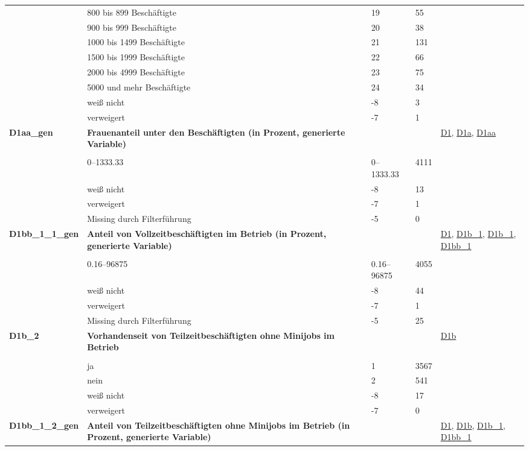\begin{longtable}{| L{2.5cm} | L{8.25cm}| C{1.5cm} | R{1.25cm} | C{2.25cm} |  }
   & 800 bis 899 Beschäftigte & 19 & 55 &  \\ 
   & 900 bis 999 Beschäftigte & 20 & 38 &  \\ 
   & 1000 bis 1499 Beschäftigte & 21 & 131 &  \\ 
   & 1500 bis 1999 Beschäftigte & 22 & 66 &  \\ 
   & 2000 bis 4999 Beschäftigte & 23 & 75 &  \\ 
   & 5000 und mehr Beschäftigte & 24 & 34 &  \\ 
   & weiß nicht & -8 & 3 &  \\ 
   & verweigert & -7 & 1 &  \\ 
   \midrule
\textbf{D1aa\_gen}\label{var:suf:D1aa:gen} & \textbf{Frauenanteil unter den Beschäftigten (in Prozent, generierte Variable)} &  &  & \hyperref[D1]{D1}, \hyperref[D1a]{D1a}, \hyperref[D1aa]{D1aa} \\ 
   &  &  &  &  \\ 
   & 0--1333.33 & 0--1333.33 & 4111 &  \\ 
   & weiß nicht & -8 & 13 &  \\ 
   & verweigert & -7 & 1 &  \\ 
   & Missing durch Filterführung & -5 & 0 &  \\ 
   \midrule
\textbf{D1bb\_1\_1\_gen}\label{var:suf:D1bb:1:1:gen} & \textbf{Anteil von Vollzeitbeschäftigten im Betrieb (in Prozent, generierte Variable)} &  &  & \hyperref[D1]{D1}, \hyperref[D1b:1]{D1b\_1}, \hyperref[D1b:1]{D1b\_1}, \hyperref[D1bb:1]{D1bb\_1} \\ 
   &  &  &  &  \\ 
   & 0.16--96875 & 0.16--96875 & 4055 &  \\ 
   & weiß nicht & -8 & 44 &  \\ 
   & verweigert & -7 & 1 &  \\ 
   & Missing durch Filterführung & -5 & 25 &  \\ 
   \midrule
\textbf{D1b\_2}\label{var:suf:D1b:2} & \textbf{Vorhandenseit von Teilzeitbeschäftigten ohne Minijobs im Betrieb} &  &  & \hyperref[D1b]{D1b} \\ 
   &  &  &  &  \\ 
   & ja & 1 & 3567 &  \\ 
   & nein & 2 & 541 &  \\ 
   & weiß nicht & -8 & 17 &  \\ 
   & verweigert & -7 & 0 &  \\ 
   \midrule
\textbf{D1bb\_1\_2\_gen}\label{var:suf:D1bb:1:2:gen} & \textbf{Anteil von Teilzeitbeschäftigten ohne Minijobs im Betrieb (in Prozent, generierte Variable)} &  &  & \hyperref[D1]{D1}, \hyperref[D1b]{D1b}, \hyperref[D1b:1]{D1b\_1}, \hyperref[D1bb:1]{D1bb\_1} \\ 

\end{longtable}
